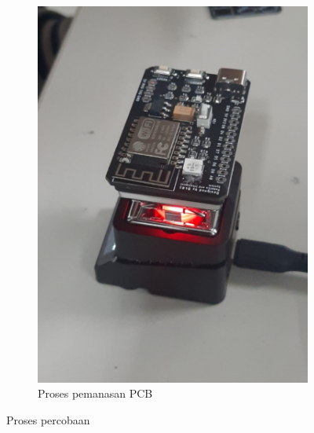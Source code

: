 \begin{figure}[H]
\begin{subfigure}[c]{0.4\linewidth}
    \includegraphics[width=\linewidth]{img/modul_4/proses_pemanasan_pcb.jpg}
    \caption{Proses pemanasan PCB \label{fig:inisub2}}
  \end{subfigure}
  \caption{Proses percobaan \label{fig:keduagambar}}
\end{figure}

